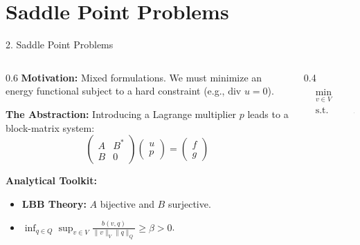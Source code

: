 \documentclass[aspectratio=169]{beamer}
\begin{document}
\section{Saddle Point Problems}
\begin{frame}{2. Saddle Point Problems}
    \begin{columns}
        \begin{column}{0.6\textwidth}
            \textbf{Motivation:} Mixed formulations. We must minimize an energy functional subject to a hard constraint (e.g., $\text{div } u = 0$).
            
            \vspace{0.2cm}
            \textbf{The Abstraction:}
            Introducing a Lagrange multiplier $p$ leads to a block-matrix system:
            $$ \begin{pmatrix} A & B^* \\ B & 0 \end{pmatrix} \begin{pmatrix} u \\ p \end{pmatrix} = \begin{pmatrix} f \\ g \end{pmatrix} $$
            
            \vspace{0.2cm}
            \textbf{Analytical Toolkit:}
            \begin{itemize}
                \item \textbf{LBB Theory:} $A$ bijective and $B$ surjective.
                \item $\inf_{q \in Q} \sup_{v \in V} \frac{b(v,q)}{\|v\|_V \|q\|_Q} \ge \beta > 0$.
            \end{itemize}
        \end{column}
        \begin{column}{0.4\textwidth}
            $$
            \begin{aligned}
                &\min_{v\in V} && \frac 1 2 a(v, v) \\
                &\text{s.t.}\quad && B v = g
            \end{aligned}
            $$
            \begin{center}
            \end{center}
        \end{column}
    \end{columns}
\end{frame}
\end{document}
